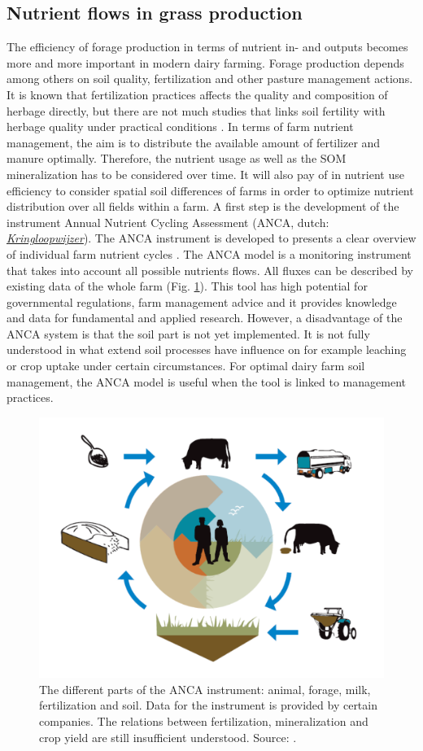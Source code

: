 \documentclass[10pt,twoside,dutch,english]{report}
\begin{document}
		\subsection{Nutrient flows in grass production}
		The efficiency of forage production in terms of nutrient in- and outputs becomes more and more important in modern dairy farming. Forage production depends among others on soil quality, fertilization and other pasture management actions. It is known that fertilization practices affects the quality and composition of herbage directly, but there are not much studies that links soil fertility with herbage quality under practical conditions \citep{Reijneveld2014}. In terms of farm nutrient management, the aim is to  distribute the available amount of fertilizer and manure optimally. Therefore, the nutrient usage as well as the SOM mineralization has to be considered over time. It will also pay of in nutrient use efficiency to consider spatial soil differences of farms in order to optimize nutrient  distribution over all fields within a farm.  A first step is the development of the instrument Annual Nutrient Cycling Assessment (ANCA, dutch: 	\href{http://www.wageningenur.nl/nl/show/KringloopWijzer-2.htm}{\textit{Kringloopwijzer}}). The ANCA instrument is developed to presents a clear overview of individual farm nutrient cycles \citep{Aarts2013}. The ANCA model is a monitoring instrument that takes into account all possible nutrients flows. All fluxes can be described by existing data of the whole farm (Fig. \ref{fig:KLW}). This tool has high potential for governmental regulations, farm management advice and it provides knowledge and data for fundamental and applied research. However, a disadvantage of the ANCA system is that the soil part is not yet implemented. It is not fully understood in what extend soil processes have influence on for example leaching or crop uptake under certain circumstances.  For optimal dairy farm soil management, the ANCA model is useful when the tool is linked to management practices. 
        
      		\begin{figure}[ht]
			\centering
			\includegraphics[width=0.6\linewidth]{intro_KLW}
			\caption{The different parts of the ANCA instrument: animal, forage, milk, fertilization and soil. Data for the instrument is provided by certain companies. The relations between fertilization, mineralization and crop yield are still insufficient understood. Source: \citet{Holster2013}. }
			\label{fig:KLW}
		\end{figure}
		
\end{document}

